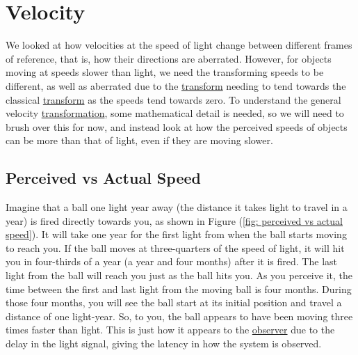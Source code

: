 
\section{Velocity} \label{sect: (intro) Velocity}

We looked at how velocities at the speed of light change between different frames of reference, that is, how their directions are aberrated.
However, for objects moving at speeds slower than light, we need the transforming speeds to be different, as well as aberrated due to the \hyperlink{def-transform}{transform} needing to tend towards the classical \hyperlink{def-transform}{transform} as the speeds tend towards zero.
To understand the general velocity \hyperlink{def-transform}{transformation}, some mathematical detail is needed, so we will need to brush over this for now, and instead look at how the perceived speeds of objects can be more than that of light, even if they are moving slower.

\subsection{Perceived vs Actual Speed} \label{subsect: Perceived vs Actual Speed}

Imagine that a ball one light year away (the distance it takes light to travel in a year) is fired directly towards you, as shown in Figure (\ref{fig: perceived vs actual speed}).
It will take one year for the first light from when the ball starts moving to reach you.
If the ball moves at three-quarters of the speed of light, it will hit you in four-thirds of a year (a year and four months) after it is fired.
The last light from the ball will reach you just as the ball hits you.
As you perceive it, the time between the first and last light from the moving ball is four months.
During those four months, you will see the ball start at its initial position and travel a distance of one light-year.
So, to you, the ball appears to have been moving three times faster than light.
This is just how it appears to the \hyperlink{def-observer}{observer} due to the delay in the light signal, giving the latency in how the system is observed.

